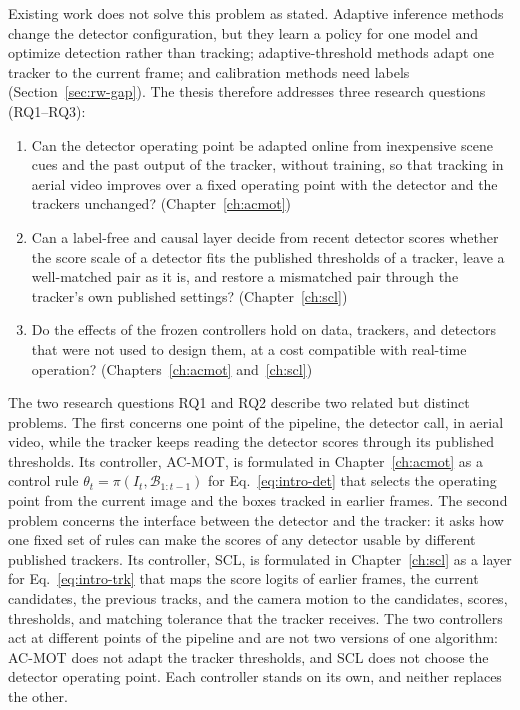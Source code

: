 Existing work does not solve this problem as stated. Adaptive inference methods change the detector configuration, but they learn a policy for one model and optimize detection rather than tracking; adaptive-threshold methods adapt one tracker to the current frame; and calibration methods need labels (Section~\ref{sec:rw-gap}). The thesis therefore addresses three research questions (RQ1--RQ3):
\begin{enumerate}
\item[\textbf{RQ1}] Can the detector operating point be adapted online from inexpensive scene cues and the past output of the tracker, without training, so that tracking in aerial video improves over a fixed operating point with the detector and the trackers unchanged? (Chapter~\ref{ch:acmot})
\item[\textbf{RQ2}] Can a label-free and causal layer decide from recent detector scores whether the score scale of a detector fits the published thresholds of a tracker, leave a well-matched pair as it is, and restore a mismatched pair through the tracker's own published settings? (Chapter~\ref{ch:scl})
\item[\textbf{RQ3}] Do the effects of the frozen controllers hold on data, trackers, and detectors that were not used to design them, at a cost compatible with real-time operation? (Chapters~\ref{ch:acmot} and~\ref{ch:scl})
\end{enumerate}

The two research questions RQ1 and RQ2 describe two related but distinct problems. The first concerns one point of the pipeline, the detector call, in aerial video, while the tracker keeps reading the detector scores through its published thresholds. Its controller, AC-MOT, is formulated in Chapter~\ref{ch:acmot} as a control rule $\theta_t=\pi(I_t,\mathcal{B}_{1:t-1})$ for Eq.~\eqref{eq:intro-det} that selects the operating point from the current image and the boxes tracked in earlier frames. The second problem concerns the interface between the detector and the tracker: it asks how one fixed set of rules can make the scores of any detector usable by different published trackers. Its controller, SCL, is formulated in Chapter~\ref{ch:scl} as a layer for Eq.~\eqref{eq:intro-trk} that maps the score logits of earlier frames, the current candidates, the previous tracks, and the camera motion to the candidates, scores, thresholds, and matching tolerance that the tracker receives. The two controllers act at different points of the pipeline and are not two versions of one algorithm: AC-MOT does not adapt the tracker thresholds, and SCL does not choose the detector operating point. Each controller stands on its own, and neither replaces the other.


